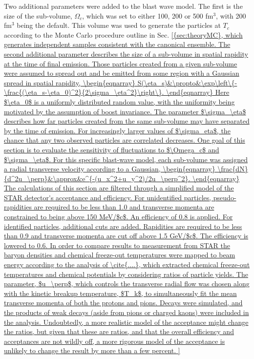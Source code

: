 Two additional parameters were added to the blast wave model. The first is the size of the sub-volume, $\Omega_c$, which was set to either 100, 200 or 500 fm$^3$, with 200 fm$^3$ being the default. This volume was used to generate the particles at $T_c$ according to the Monte Carlo procedure outline in Sec. \ref{{sec:theoryMC}, which generates independent samples consistent with the canonical ensemble. The second additional parameter describes the size of a sub-volume in spatial rapidity at the time of final emission. Those particles created from a given sub-volume were assumed to spread out and be emitted from some region with a Gaussian spread in spatial rapidity, 
\begin{eqnarray}
S(\eta_s)&\propto&\exp\left\{-\frac{(\eta_s-\eta_0)^2}{2\sigma_\eta^2}\right\}.
\end{eqnarray}
Here $\eta_0$ is a uniformly distributed random value, with the uniformity being motivated by the assumption of boost invariance. The parameter $\sigma_\eta$ describes how far particles created from the same sub-volume may have separated by the time of emission. For increasingly larger values of $\sigma_eta$, the chance that any two observed particles are correlated decreases.  One goal of this section is to evaluate the sensitivity of fluctuations to $\Omega_c$ and $\sigma_\eta$. For this specific blast-wave model, each sub-volume was assigned a radial transverse velocity according to a Gaussian,
\begin{eqnarray}
\frac{dN}{d^2u_\perp}&\approx&e^{-(u_x^2+u_y^2)/2u_\perp^2}.
\end{eqnarray}

The calculations of this section are filtered through a simplified model of the STAR detector's acceptance and efficiency. For unidentified particles, pseudo-rapidities are required to be less than 1.0 and transverse momenta are constrained to being above 150 MeV/$c$. An efficiency of 0.8 is applied. For identified particles, additional cuts are added. Rapidities are required to be less than 0.9 and transverse momenta are cut off above 1.5 GeV/$c$. The efficiency is lowered to 0.6. In order to compare results to measurement from STAR the baryon densities and chemical freeze-out temperatures were mapped to beam energy according to the analysis of \cite{....}, which extracted chemical freeze-out temperatures and chemical potentials by considering ratios of particle yields. The parameter, $u_\perp$, which controls the transverse radial flow was chosen along with the kinetic breakup temperature, $T_k$, to simultaneously fit the mean transverse momenta of both the protons and pions. Decays were simulated, and the products of weak decays (aside from pions or charged kaons) were included in the analysis. Undoubtedly, a more realistic model of the acceptance might change the ratios, but given that these are ratios, and that the overall efficiency and acceptances are not wildly off, a more rigorous model of the acceptance is unlikely to change the result by more than a few percent.

}
